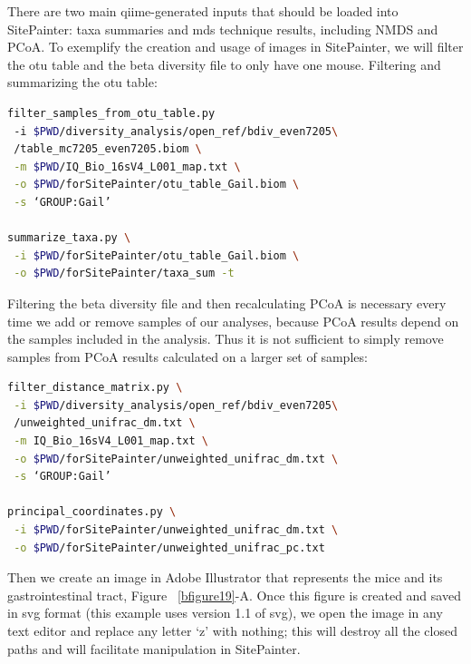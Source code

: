 There are two main \gls{qiime}-generated inputs that should be loaded into SitePainter: taxa summaries and
\gls{mds} technique results, including NMDS and PCoA. To exemplify the creation and usage of images in
SitePainter, we will filter the \gls{otu} table and the beta diversity file to only have one mouse.
Filtering and summarizing the \gls{otu} table:

\begin{lstlisting}[language=bash]
filter_samples_from_otu_table.py
 -i $PWD/diversity_analysis/open_ref/bdiv_even7205\
 /table_mc7205_even7205.biom \
 -m $PWD/IQ_Bio_16sV4_L001_map.txt \
 -o $PWD/forSitePainter/otu_table_Gail.biom \
 -s ‘GROUP:Gail’

summarize_taxa.py \
 -i $PWD/forSitePainter/otu_table_Gail.biom \
 -o $PWD/forSitePainter/taxa_sum -t
\end{lstlisting}

Filtering the beta diversity file and then recalculating PCoA is necessary every time we add or remove
samples of our analyses, because PCoA results depend on the samples included in the analysis. Thus it is
not sufficient to simply remove samples from PCoA results calculated on a larger set of samples:

\begin{lstlisting}[language=bash]
filter_distance_matrix.py \
 -i $PWD/diversity_analysis/open_ref/bdiv_even7205\
 /unweighted_unifrac_dm.txt \
 -m IQ_Bio_16sV4_L001_map.txt \
 -o $PWD/forSitePainter/unweighted_unifrac_dm.txt \
 -s ‘GROUP:Gail’

principal_coordinates.py \
 -i $PWD/forSitePainter/unweighted_unifrac_dm.txt \
 -o $PWD/forSitePainter/unweighted_unifrac_pc.txt
\end{lstlisting}

Then we create an image in Adobe Illustrator that represents the mice and its gastrointestinal tract,
Figure ~\ref{bfigure19}-A. Once this figure is created and saved in \gls{svg} format (this example uses
version 1.1 of \gls{svg}), we open the image in any text editor and replace any letter ‘z’ with nothing;
this will destroy all the closed paths and will facilitate manipulation in SitePainter.

